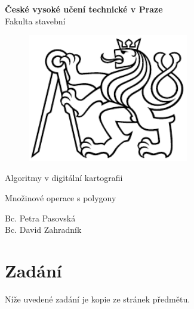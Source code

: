 \documentclass[a4paper, 12pt]{article}
\begin{document}
\begin{titlepage}
\begin{center}
\noindent
\Large \textbf{České vysoké učení technické v Praze }\\ Fakulta stavební
\vspace{5cm}

\huge

\begin{figure}[h!]
	\centering
	\includegraphics[width=7cm]{pictures/logo.png}
\end{figure}

\vspace{0.5cm}

Algoritmy v digitální kartografii \\

\vspace{3cm}

\Huge  
Množinové operace s polygony\\

\vspace{2cm}

\Large
Bc. Petra Pasovská \\
Bc. David Zahradník \\

\end{center}

\end{titlepage}




\pagestyle{plain}     %
\setcounter{page}{1}  %

\tableofcontents
\newpage

\section{Zadání}
Níže uvedené zadání je kopie ze stránek předmětu. 
\end{document}

